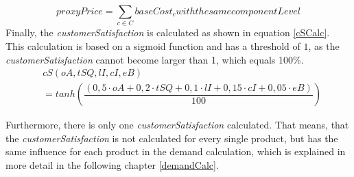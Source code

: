 \begin{equation}
    proxyPrice = \sum_{c \in C} baseCost_{c} with the same componentLevel
\end{equation}
Finally, the \textit{customerSatisfaction} is calculated as shown in equation \ref{cSCalc}. This calculation is based on a sigmoid function and has a threshold of $1$, as the \textit{customerSatisfaction} cannot become larger than 1, which equals 100\%.
\begin{equation}
\begin{aligned}
\label{cSCalc}
    & cS(oA, tSQ, lI, cI, eB) \\
    & = tanh(\dfrac{(0,5 \cdot oA + 0,2 \cdot tSQ + 0,1 \cdot lI + 0,15 \cdot cI + 0,05 \cdot eB)}{100}) %
\end{aligned}    
\end{equation}

Furthermore, there is only one \textit{customerSatisfaction} calculated. That means, that the \textit{customerSatisfaction} is not calculated for every single product, but has the same influence for each product in the demand calculation, which is explained in more detail in the following chapter \ref{demandCalc}.

